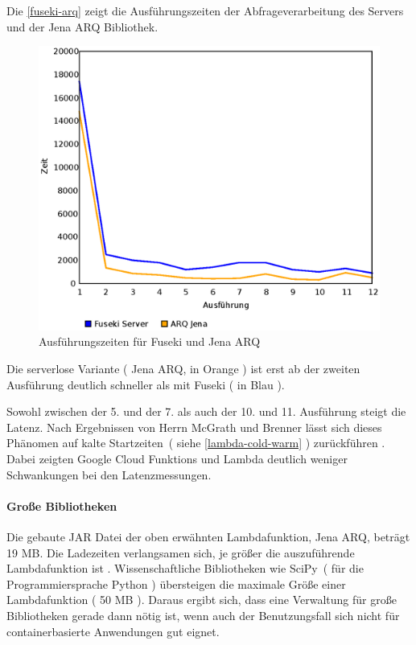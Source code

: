 \documentclass[
12pt,
english,
ngerman,
headsepline,
twoside,
openright,
numbers=noenddot,version=first
]{scrreprt}
\begin{document}
Die \autoref{fuseki-arq} zeigt die Ausführungszeiten der Abfrageverarbeitung des Servers und der Jena ARQ Bibliothek. 
\begin{figure}[H]
	\centering{}
	\includegraphics[scale=0.60]{./pics/fuseki-arq.eps}
	\caption{Ausführungszeiten für Fuseki und Jena ARQ }
	\label{fuseki-arq}
\end{figure}

Die serverlose Variante ( Jena ARQ, in Orange ) ist erst ab der zweiten Ausführung deutlich schneller als mit Fuseki ( in Blau ).


Sowohl zwischen der 5. und der 7. als auch der 10. und 11. Ausführung steigt die Latenz. Nach Ergebnissen von Herrn McGrath und Brenner lässt sich dieses Phänomen auf \glqq kalte Startzeiten\grqq\ ( siehe \autoref{lambda-cold-warm} ) zurückführen . Dabei zeigten Google Cloud Funktions und Lambda deutlich weniger Schwankungen bei den Latenzmessungen. \cite{servPerform}


\paragraph{Große Bibliotheken}
Die gebaute JAR Datei der oben erwähnten Lambdafunktion, Jena ARQ, beträgt 19 MB. Die Ladezeiten verlangsamen sich, je größer die auszuführende Lambdafunktion ist \cite{lambdaBibliothek}. Wissenschaftliche Bibliotheken wie \glqq SciPy\grqq\ ( für die Programmiersprache Python ) übersteigen die maximale Größe einer Lambdafunktion ( 50 MB ).
Daraus ergibt sich, dass eine Verwaltung für große Bibliotheken gerade dann nötig ist, wenn auch der Benutzungsfall sich nicht für containerbasierte Anwendungen gut eignet. 
\end{document}
